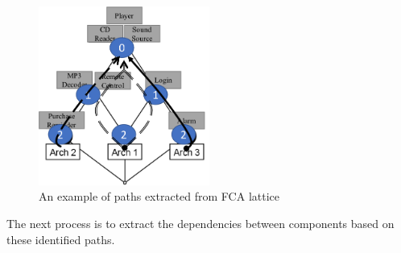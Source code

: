 \documentclass[graybox]{svmult}
\begin{document}
\begin{figure} [h]
\centering
\includegraphics[width=0.5\textwidth]{figs/FCA_Arch_path.png}
\caption{An example of paths extracted from FCA lattice}
\label{fig:FCA_Arch_Path}
\end{figure}

The next process is to extract the dependencies between components based on these identified paths.
\end{document}
